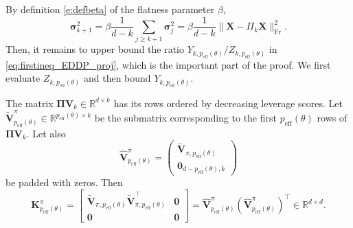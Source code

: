 \documentclass[twoside,11pt]{book}
\numberwithin{theorem}{chapter}
\numberwithin{definition}{chapter}
\numberwithin{proposition}{chapter}
\numberwithin{corollary}{chapter}
\numberwithin{example}{chapter}
\numberwithin{lemma}{chapter}
\numberwithin{assumption}{chapter}
\DeclareMathOperator{\Fr}{\mathrm{Fr}}
\DeclareMathOperator{\eff}{\mathrm{eff}}
\DeclareMathOperator{\Tran}{\intercal}
\begin{document}
By definition \eqref{e:defbeta} of the flatness parameter $\beta$,
\begin{equation}
	\label{eq:upperbound_sigmakplus1}
	\bm{\sigma}_{k+1}^{2}
	= \beta \frac{1}{d-k} \sum\limits_{j \geq k+1} \bm{\sigma}_{j}^{2}
	= \beta \frac{1}{d-k}\| \bm{X}-\Pi_k\bm{X}\|_{\Fr}^{2}.
\end{equation}
Then, it remains to upper bound the ratio $Y_{k,p_{\eff}(\theta)}/Z_{k,p_{\eff}(\theta)}$ in \eqref{eq:firstineq_EDDP_proj}, which is the important part of the proof. We first evaluate $Z_{k,p_{\eff}(\theta)}$ and then bound $Y_{k,p_{\eff}(\theta)}$.
%

The matrix $\bm{\Pi}\bm{V}_{k}\in\mathbb{R}^{d\times k}$ has its rows ordered by decreasing leverage scores. Let $\tilde{\bm{V}}^\pi_{p_{\eff}(\theta)} \in \mathbb{R}^{p_{\eff}(\theta)\times k} $ be the submatrix corresponding to the first $p_{\eff}(\theta)$ rows of $\bm{\Pi}\bm{V}_{k}$. Let also
$$\hat{\bm{V}}_{p_{\eff}(\theta)}^\pi = \begin{pmatrix}\tilde{\bm{V}}_{\pi,p_{\eff}(\theta)}\\ \bm{0}_{d-p_{\eff}(\theta),k}\end{pmatrix}$$
be padded with zeros. Then
\begin{equation}
	\bm{K}^{\pi}_{p_{\eff}(\theta)} = \left[
	\begin{array}{c|c}
		\tilde{\bm{V}}_{\pi,p_{\eff}(\theta)} \tilde{\bm{V}}_{\pi,p_{\eff}(\theta)}^{\Tran}& \bm{0} \\
		\hline
		\bm{0} & \bm{0}
	\end{array}
	\right] = \hat{\bm{V}}_{p_{\eff}(\theta)}^\pi (\hat{\bm{V}}^\pi_{p_{\eff}(\theta)})^{\Tran} \in\mathbb{R}^{d\times d}.
\end{equation}
\end{document}
